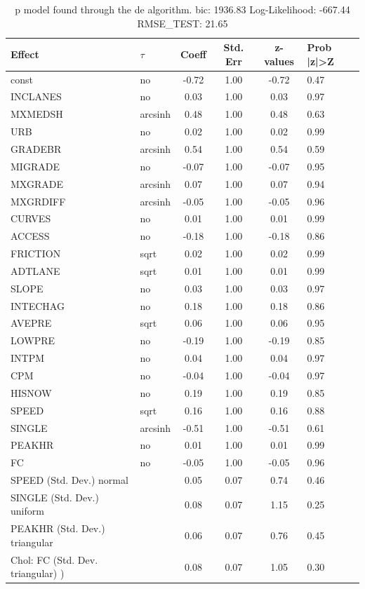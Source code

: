 \begin{table}
	\caption{p model found through the de algorithm. bic: 1936.83 Log-Likelihood: -667.44 RMSE_TEST: 21.65}
	\begin{center}
		\begin{tabular}{|l|l|c|c|c|l|}
			\hline
			Effect & $\tau$ & Coeff & Std. Err & z-values & Prob |z|>Z \\
			\hline
			const & no & -0.72 & 1.00 & -0.72 & 0.47 \\
			\hline
			INCLANES & no & 0.03 & 1.00 & 0.03 & 0.97 \\
			\hline
			MXMEDSH & arcsinh & 0.48 & 1.00 & 0.48 & 0.63 \\
			\hline
			URB & no & 0.02 & 1.00 & 0.02 & 0.99 \\
			\hline
			GRADEBR & arcsinh & 0.54 & 1.00 & 0.54 & 0.59 \\
			\hline
			MIGRADE & no & -0.07 & 1.00 & -0.07 & 0.95 \\
			\hline
			MXGRADE & arcsinh & 0.07 & 1.00 & 0.07 & 0.94 \\
			\hline
			MXGRDIFF & arcsinh & -0.05 & 1.00 & -0.05 & 0.96 \\
			\hline
			CURVES & no & 0.01 & 1.00 & 0.01 & 0.99 \\
			\hline
			ACCESS & no & -0.18 & 1.00 & -0.18 & 0.86 \\
			\hline
			FRICTION & sqrt & 0.02 & 1.00 & 0.02 & 0.99 \\
			\hline
			ADTLANE & sqrt & 0.01 & 1.00 & 0.01 & 0.99 \\
			\hline
			SLOPE & no & 0.03 & 1.00 & 0.03 & 0.97 \\
			\hline
			INTECHAG & no & 0.18 & 1.00 & 0.18 & 0.86 \\
			\hline
			AVEPRE & sqrt & 0.06 & 1.00 & 0.06 & 0.95 \\
			\hline
			LOWPRE & no & -0.19 & 1.00 & -0.19 & 0.85 \\
			\hline
			INTPM & no & 0.04 & 1.00 & 0.04 & 0.97 \\
			\hline
			CPM & no & -0.04 & 1.00 & -0.04 & 0.97 \\
			\hline
			HISNOW & no & 0.19 & 1.00 & 0.19 & 0.85 \\
			\hline
			SPEED & sqrt & 0.16 & 1.00 & 0.16 & 0.88 \\
			\hline
			SINGLE & arcsinh & -0.51 & 1.00 & -0.51 & 0.61 \\
			\hline
			PEAKHR & no & 0.01 & 1.00 & 0.01 & 0.99 \\
			\hline
			FC & no & -0.05 & 1.00 & -0.05 & 0.96 \\
			\hline
			SPEED (Std. Dev.) normal &  & 0.05 & 0.07 & 0.74 & 0.46 \\
			\hline
			SINGLE (Std. Dev.) uniform &  & 0.08 & 0.07 & 1.15 & 0.25 \\
			\hline
			PEAKHR (Std. Dev.) triangular &  & 0.06 & 0.07 & 0.76 & 0.45 \\
			\hline
			 Chol: FC (Std. Dev. triangular) ) &  & 0.08 & 0.07 & 1.05 & 0.30 \\
			\hline
		\end{tabular}
	\end{center}
\end{table}
